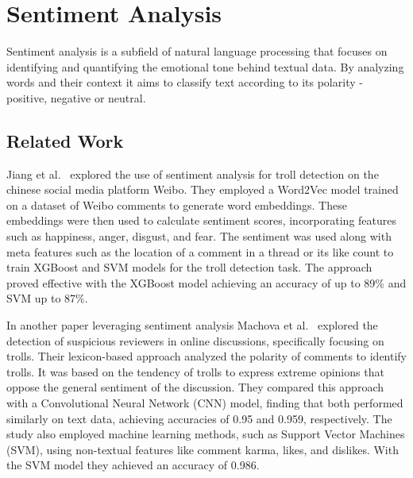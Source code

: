 \documentclass[twoside]{ctuthesis}
\theoremstyle{plain}
\theoremstyle{definition}
\theoremstyle{note}
\begin{document}
\section{Sentiment Analysis}
Sentiment analysis is a subfield of natural language processing that focuses on identifying and quantifying the emotional tone behind textual data. By analyzing words and their context  it aims to classify text according to its polarity - positive, negative or neutral.\par


\subsection{Related Work}
Jiang et al.~\cite{Jiang2021Sentiment} explored the use of sentiment analysis for troll detection on the chinese social media platform Weibo.  They employed a Word2Vec model trained on a dataset of Weibo comments to generate word embeddings. These embeddings were then used to calculate sentiment scores, incorporating features such as happiness, anger, disgust, and fear. The sentiment was used along with meta features such as the location of a comment in a thread or its like count to train XGBoost and SVM models for the troll detection task. The approach proved effective with the XGBoost model achieving an accuracy of up to 89\% and SVM up to 87\%.\par
In another paper leveraging sentiment analysis Machova et al.~\cite{Machova2022Comparison} explored the detection of suspicious reviewers in online discussions, specifically focusing on trolls. Their lexicon-based approach analyzed the polarity of comments to identify trolls. It was based on the tendency of trolls to express extreme opinions that oppose the general sentiment of the discussion. They compared this approach with a Convolutional Neural Network (CNN) model, finding that both performed similarly on text data, achieving accuracies of 0.95 and 0.959, respectively.  The study also employed machine learning methods, such as Support Vector Machines (SVM), using non-textual features like comment karma, likes, and dislikes. With the SVM model they achieved an accuracy of 0.986.
\end{document}
